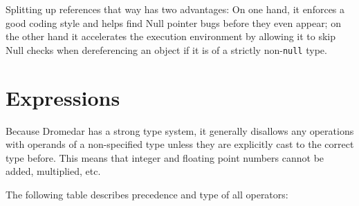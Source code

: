 \documentclass{article}
\newcommand{\code}[1]{\lstinline[columns=fixed]{#1}}
\begin{document}
			Splitting up references that way has two advantages: On one hand, it enforces a good coding style and helps find Null pointer bugs before they even appear; on the other hand it accelerates the execution environment by allowing it to skip Null checks when dereferencing an object if it is of a strictly non-\code{null} type.
		
	\section{Expressions}
	
		Because Dromedar has a strong type system, it generally disallows any operations with operands of a non-specified type unless they are explicitly cast to the correct type before. This means that integer and floating point numbers cannot be added, multiplied, etc.
		
		The following table describes precedence and type of all operators:\\
		
\end{document}
